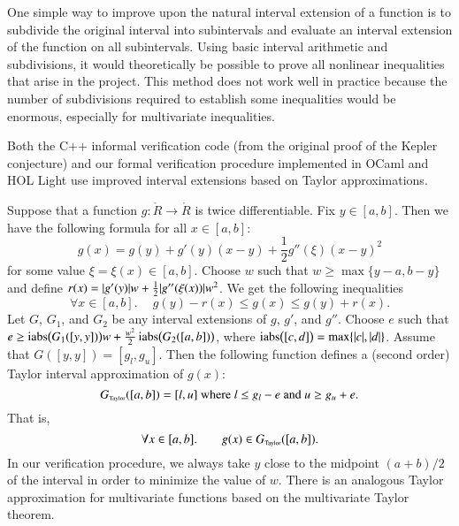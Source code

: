 One simple way to improve upon the natural interval extension of a
function is to subdivide the original interval into subintervals and
evaluate an interval extension of the function on all subintervals.
Using basic interval arithmetic and subdivisions, it would
theoretically be possible to prove all nonlinear inequalities that
arise in the project. This method does not work well in practice
because the number of subdivisions required to establish some
inequalities would be enormous, especially for multivariate
inequalities.

Both the  C++ informal verification code (from
the original proof of the Kepler conjecture) and our formal
verification procedure implemented in OCaml and HOL Light use improved
interval extensions based on Taylor approximations.

Suppose that a function $g:\ring{R}\to\ring{R}$ is twice differentiable. Fix $y \in
[a,b]$. Then we have the following formula for all $x \in [a,b]$:
\begin{equation*}
g(x) = g(y) + g'(y)(x - y) + \frac{1}{2}g''(\xi)(x - y)^2
\end{equation*}
for some value $\xi = \xi(x) \in [a,b]$.  Choose $w$ such that $w \ge
\max\{y - a, b - y\}$ and define $r(x) = \lvert g'(y)\rvert w +
\frac{1}{2}\lvert g''(\xi(x))\rvert w^2$. We get the following inequalities
\begin{equation*}
\forall x \in [a,b].\quad\ g(y) - r(x) \le g(x) \le g(y) + r(x).
\end{equation*}
Let $G$, $G_1$, and $G_2$ be any interval extensions of $g$, $g'$, and
$g''$. Choose $e$ such that $e \ge \mathop{\rm iabs}\bigl(G_1([y,y])\bigr)w +
\frac{w^2}{2}\mathop{\rm iabs}\bigl(G_2([a,b])\bigr)$, where
$\mathop{\rm iabs}\bigl([c,d]\bigr) = \max\{\lvert c\rvert, \lvert d\rvert\}$.  Assume that
$G([y,y]) = [g_l,g_u]$. Then the following function defines a (second
order) Taylor interval approximation of $g(x)$:
\begin{equation*}
G_{\hbox{\tiny Taylor}}([a,b]) = [l, u] \text{ where $l \le g_l - e$ and $u \ge g_u + e$}.
\end{equation*}
That is,
\begin{equation*}
\forall x \in [a,b].\quad \quad g(x) \in G_{\hbox{\tiny Taylor}}([a,b]).
\end{equation*}
In our verification procedure, we always take $y$ close to the
midpoint $(a+b)/2$ of the interval in order to minimize the value of
$w$. There is an analogous Taylor approximation for multivariate
functions based on the multivariate Taylor theorem.

